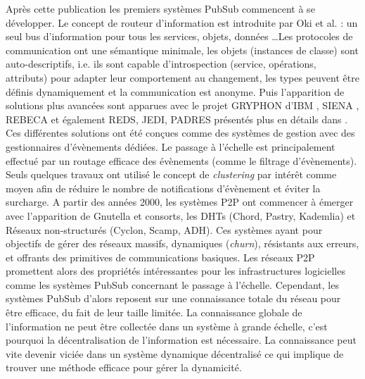 Après cette publication les premiers systèmes \gls{PubSub} commencent à 
se développer. Le concept de routeur d'information est introduite par Oki et al. 
\cite{Oki1993} : un seul bus d'information pour tous les services, objets, données 
\ldots Les protocoles de communication ont une sémantique minimale, 
les objets (instances de classe) sont auto-descriptifs, i.e. ils sont 
capable d'introspection (service, opérations, attributs) pour adapter leur 
comportement au changement, les types peuvent être définis dynamiquement et 
la communication est anonyme. 
Puis l'apparition de solutions plus avancées sont apparues avec le projet 
GRYPHON d'IBM \cite{Banavar1999}, SIENA \cite{Carzaniga2000}, REBECA 
\cite{Parzyjegla2010} et également REDS, JEDI, PADRES présentés plus en 
détails dans \cite{Tarkoma2012}.
Ces différentes solutions ont été conçues comme des systèmes de gestion avec 
des gestionnaires d'évènements dédiées. Le passage à l'échelle est 
principalement effectué par un routage efficace des évènements (comme le 
filtrage d'évènements). Seuls quelques travaux ont utilisé le concept de 
\textit{clustering} par intérêt comme moyen afin de réduire le nombre de 
notifications d'évènement et éviter la surcharge. 
A partir des années 2000, les 
systèmes \gls{P2P} ont commencer à émerger avec 
l'apparition de Gnutella et consorts, les DHTs (Chord, Pastry, Kademlia) et  
Réseaux non-structurés (Cyclon, Scamp, ADH). Ces systèmes ayant pour 
objectifs de gérer des réseaux massifs, dynamiques (\textit{churn}), résistants 
aux 
erreurs, et offrants des primitives de communications basiques.
Les réseaux P2P promettent alors des propriétés intéressantes pour les 
infrastructures logicielles comme les systèmes PubSub concernant le passage à 
l'échelle. Cependant, les systèmes PubSub d'alors reposent sur une connaissance 
totale du réseau pour être efficace, du fait de leur taille limitée. La connaissance 
globale de l'information ne peut être collectée dans un système à grande échelle, 
c'est pourquoi la décentralisation de l'information est nécessaire. La connaissance 
peut vite devenir viciée dans un système dynamique décentralisé ce qui implique 
de trouver une méthode efficace pour gérer la dynamicité.

	
	
